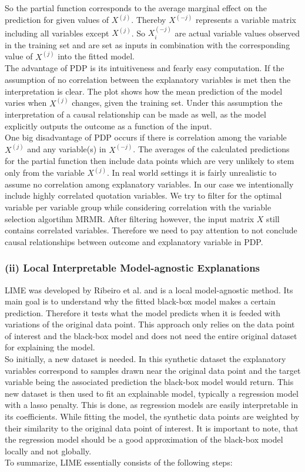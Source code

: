 \documentclass[12pt,titlepage]{article}
\begin{document}
\noindent
So the partial function corresponds to the average marginal effect on the prediction for given values of $X^{(j)}$. Thereby $X^{(-j)}$ represents a variable matrix including all variables except $X^{(j)}$. So $X^{(-j)}_{i}$ are actual variable values observed in the training set and are set as inputs in combination with the corresponding value of $X^{(j)}$ into the fitted model. \\
The advantage of PDP is its intuitiveness and fearly easy computation. If the assumption of no correlation between the explanatory variables is met then the interpretation is clear. The plot shows how the mean prediction of the model varies when $X^{(j)}$ changes, given the training set. Under this assumption the interpretation of a causal relationship can be made as well, as the model explicitly outputs the outcome as a function of the input. \\
One big disadvantage of PDP occurs if there is correlation among the variable $X^{(j)}$ and any variable(s) in $X^{(-j)}$. The averages of the calculated predictions for the partial function then include data points which are very unlikely to stem only from the variable $X^{(j)}$. In real world settings it is fairly unrealistic to assume no correlation among explanatory variables. In our case we intentionally include highly correlated quotation variables. We try to filter for the optimal variable per variable group while considering correlation with the variable selection algortihm MRMR. After filtering however, the input matrix $X$ still contains correlated variables. Therefore we need to pay attention to not conclude causal relationships between outcome and explanatory variable in PDP. \\

\subsubsection*{(ii) Local Interpretable Model-agnostic Explanations}

LIME was developed by Ribeiro et al. \cite{lime} and is a local model-agnostic method. Its main goal is to understand why the fitted black-box model makes a certain prediction. Therefore it tests what the model predicts when it is feeded with variations of the original data point. This approach only relies on the data point of interest and the black-box model and does not need the entire original dataset for explaining the model. \\
So initially, a new dataset is needed. In this synthetic dataset the explanatory variables correspond to samples drawn near the original data point and the target variable being the associated prediction the black-box model would return. This new dataset is then used to fit an explainable model, typically a regression model with a lasso penalty. This is done, as regression models are easily interpretable in its coefficients. While fitting the model, the synthetic data points are weighted by their similarity to the original data point of interest. It is important to note, that the regression model should be a good approximation of the black-box model locally and not globally. \\
To summarize, LIME essentially consists of the following steps:
\end{document}
